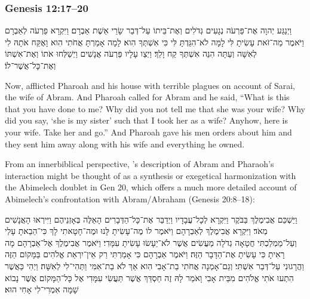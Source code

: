 \subsubsection{Genesis 12:17--20}
\begin{hebrewtext}
    ‏וַיְנַגַּע יְהוָה אֶת־פַּרְעֹה נְגָעִים גְּדֹלִים וְאֶת־בֵּיתוֹ עַל־דְּבַר שָׂרַי אֵשֶׁת אַבְרָם׃
    וַיִּקְרָא פַרְעֹה לְאַבְרָם וַיֹּאמֶר מַה־זֹּאת עָשִׂיתָ לִּי לָמָּה לֹא־הִגַּדְתָּ לִּי כִּי אִשְׁתְּךָ הִוא׃
    לָמָה אָמַרְתָּ אֲחֹתִי הִוא וָאֶקַּח אֹתָהּ לִי לְאִשָּׁה וְעַתָּה הִנֵּה אִשְׁתְּךָ קַח וָלֵךְ׃ 
    וַיְצַו עָלָיו פַּרְעֹה אֲנָשִׁים וַיְשַׁלְּחוּ אֹתוֹ וְאֶת־אִשְׁתּוֹ וְאֶת־כָּל־אֲשֶׁר־לוֹ׃
\end{hebrewtext}

\begin{translation}
    Now, \yahweh afflicted Pharoah and his house with terrible plagues on account of Sarai, the wife of Abram. 
    And Pharoah called for Abram and he said, ``What is this that you have done to me? Why did you not tell me that she was your wife? 
    Why did you say, `she is my sister' such that I took her as a wife? Anyhow, here is your wife. Take her and go.''
    And Pharoah gave his men orders about him and they sent him away along with his wife and everything he owned.
\end{translation}

From an innerbiblical perspective, \ga's description of Abram and Pharaoh's interaction might be thought of as a synthesis or exegetical harmonization with the Abimelech doublet in Gen 20, which offers a much more detailed account of Abimelech's confrontation with Abram/Abraham (Genesis 20:8--18):

\begin{hebrewtext}
    וַיַּשְׁכֵּם אֲבִימֶלֶךְ בַּבֹּקֶר וַיִּקְרָא לְכָל־עֲבָדָיו וַיְדַבֵּר אֶת־כָּל־הַדְּבָרִים הָאֵלֶּה בְּאָזְנֵיהֶם וַיִּירְאוּ הָאֲנָשִׁים מְאֹד׃
    וַיִּקְרָא אֲבִימֶלֶךְ לְאַבְרָהָם וַיֹּאמֶר לוֹ מֶה־עָשִׂיתָ לָּנוּ וּמֶה־חָטָאתִי לָךְ כִּי־הֵבֵאתָ עָלַי וְעַל־מַמְלַכְתִּי חֲטָאָה גְדֹלָה מַעֲשִׂים אֲשֶׁר לֹא־יֵעָשׂוּ עָשִׂיתָ עִמָּדִי׃
    וַיֹּאמֶר אֲבִימֶלֶךְ אֶל־אַבְרָהָם מָה רָאִיתָ כִּי עָשִׂיתָ אֶת־הַדָּבָר הַזֶּה׃
    וַיֹּאמֶר אַבְרָהָם כִּי אָמַרְתִּי רַק אֵין־יִרְאַת אֱלֹהִים בַּמָּקוֹם הַזֶּה וַהֲרָגוּנִי עַל־דְּבַר אִשְׁתִּי׃
    וְגַם־אָמְנָה אֲחֹתִי בַת־אָבִי הִוא אַךְ לֹא בַת־אִמִּי וַתְּהִי־לִי לְאִשָּׁה׃
    וַיְהִי כַּאֲשֶׁר הִתְעוּ אֹתִי אֱלֹהִים מִבֵּית אָבִי וָאֹמַר לָהּ זֶה חַסְדֵּךְ אֲשֶׁר תַּעֲשִׂי עִמָּדִי אֶל כָּל־הַמָּקוֹם אֲשֶׁר נָבוֹא שָׁמָּה אִמְרִי־לִי אָחִי הוּא׃
\end{hebrewtext}


